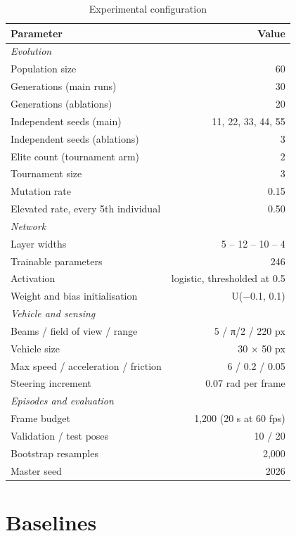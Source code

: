\documentclass[conference]{IEEEtran}
\begin{document}
\begin{table}[!t]
\caption{Experimental configuration}
\label{tab:hyper}
\centering
\footnotesize
\begin{tabular}{lr}
\toprule
Parameter & Value \\
\midrule
\multicolumn{2}{l}{\emph{Evolution}} \\
Population size & 60 \\
Generations (main runs) & 30 \\
Generations (ablations) & 20 \\
Independent seeds (main) & 11, 22, 33, 44, 55 \\
Independent seeds (ablations) & 3 \\
Elite count (tournament arm) & 2 \\
Tournament size & 3 \\
Mutation rate & 0.15 \\
Elevated rate, every 5th individual & 0.50 \\
\multicolumn{2}{l}{\emph{Network}} \\
Layer widths & 5 – 12 – 10 – 4 \\
Trainable parameters & 246 \\
Activation & logistic, thresholded at 0.5 \\
Weight and bias initialisation & U(−0.1, 0.1) \\
\multicolumn{2}{l}{\emph{Vehicle and sensing}} \\
Beams / field of view / range & 5 / π/2 / 220 px \\
Vehicle size & 30 × 50 px \\
Max speed / acceleration / friction & 6 / 0.2 / 0.05 \\
Steering increment & 0.07 rad per frame \\
\multicolumn{2}{l}{\emph{Episodes and evaluation}} \\
Frame budget & 1,200 (20 s at 60 fps) \\
Validation / test poses & 10 / 20 \\
Bootstrap resamples & 2,000 \\
Master seed & 2026 \\
\bottomrule
\end{tabular}
\end{table}

\section{Baselines}
\end{document}
